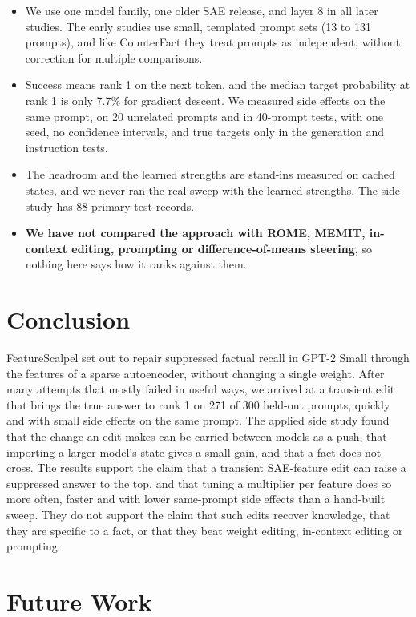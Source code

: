 \begin{itemize}
  \item We use one model family, one older SAE release, and layer 8 in all later studies. The early studies use small, templated prompt sets (13 to 131 prompts), and like CounterFact they treat prompts as independent, without correction for multiple comparisons.
  \item Success means rank 1 on the next token, and the median target probability at rank 1 is only 7.7\% for gradient descent. We measured side effects on the same prompt, on 20 unrelated prompts and in 40-prompt tests, with one seed, no confidence intervals, and true targets only in the generation and instruction tests.
  \item The headroom and the learned strengths are stand-ins measured on cached states, and we never ran the real sweep with the learned strengths. The side study has 88 primary test records.
  \item \textbf{We have not compared the approach with ROME, MEMIT, in-context editing, prompting or difference-of-means steering}, so nothing here says how it ranks against them.
\end{itemize}

\section{Conclusion}

FeatureScalpel set out to repair suppressed factual recall in GPT-2 Small through the features of a sparse autoencoder, without changing a single weight. After many attempts that mostly failed in useful ways, we arrived at a transient edit that brings the true answer to rank 1 on 271 of 300 held-out prompts, quickly and with small side effects on the same prompt. The applied side study found that the change an edit makes can be carried between models as a push, that importing a larger model's state gives a small gain, and that a fact does not cross. The results support the claim that a transient SAE-feature edit can raise a suppressed answer to the top, and that tuning a multiplier per feature does so more often, faster and with lower same-prompt side effects than a hand-built sweep. They do not support the claim that such edits recover knowledge, that they are specific to a fact, or that they beat weight editing, in-context editing or prompting.

\section{Future Work}

